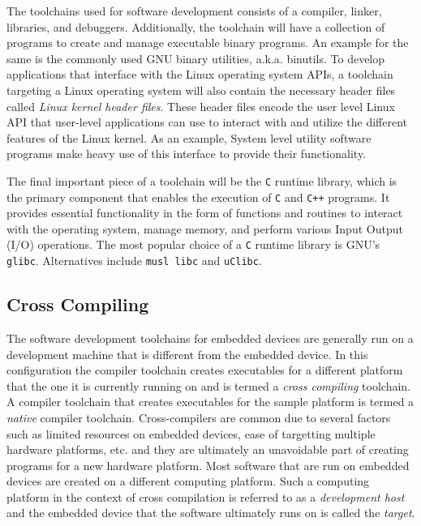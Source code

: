 The toolchains used for software development consists of a compiler, linker, libraries, and debuggers. Additionally, the toolchain will have a collection of programs to create and manage executable binary programs. An example for the same is the commonly used GNU binary utilities, a.k.a. binutils. To develop applications that interface with the Linux operating system APIs, a toolchain targeting a Linux operating system will also contain the necessary header files called \textit{Linux kernel header files}. These header files encode the user level Linux API that user-level applications can use to interact with and utilize the different features of the Linux kernel. As an example, System level utility software programs make heavy use of this interface to provide their functionality.

The final important piece of a toolchain will be the \texttt{C} runtime library, which is the primary component that enables the execution of \texttt{C} and \texttt{C++} programs. It provides essential functionality in the form of functions and routines to interact with the operating system, manage memory, and perform various Input Output (I/O) operations. The most popular choice of a \texttt{C} runtime library is GNU's \texttt{glibc}. Alternatives include \texttt{musl libc} and \texttt{uClibc}.

\subsection{Cross Compiling}

The software development toolchains for embedded devices are generally run on a development machine that is different from the embedded device. In this configuration the compiler toolchain creates executables for a different platform that the one it is currently running on and is termed a \textit{cross compiling} toolchain. A compiler toolchain that creates executables for the sample platform is termed a \textit{native} compiler toolchain. Cross-compilers are common due to several factors such as limited resources on embedded devices, ease of targetting multiple hardware platforms, etc. and they are ultimately an unavoidable part of creating programs for a new hardware platform. Most software that are run on embedded devices are created on a different computing platform. Such a computing platform in the context of cross compilation is referred to as a \textit{development host} and the embedded device that the software ultimately runs on is called the \textit{target}.


